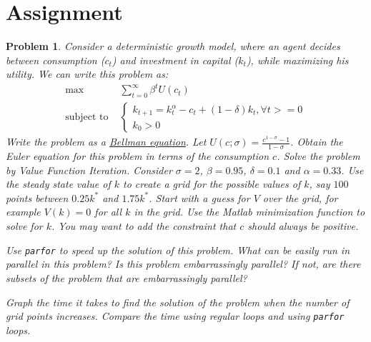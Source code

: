 \documentclass[12pt, a4paper]{article}
\newtheorem{problem}{Problem}
\begin{document}
\section{Assignment}
\label{sec:org52739c4}
\begin{problem}
Consider a deterministic growth model, where an agent decides between consumption (\(c_t\)) and investment in capital (\(k_t\)), while maximizing his utility.
We can write this problem as:
\begin{align*}
  \max&\sum_{t=0}^{\infty}\beta^tU(c_t)\\
  \text{subject to }&
                      \begin{cases}
                        k_{t+1} = k_t^{\alpha} - c_t + (1-\delta)k_t, \forall t >= 0\\
                        k_0 > 0
                      \end{cases}
\end{align*}
Write the problem as a \href{https://en.wikipedia.org/wiki/Bellman\_equation}{Bellman equation}.
Let \(U(c; \sigma)=\frac{c^{1-\sigma}-1}{1-\sigma}\).
Obtain the Euler equation for this problem in terms of the consumption \(c\).
Solve the problem by Value Function Iteration.
Consider \(\sigma=2\), \(\beta=0.95\), \(\delta=0.1\) and \(\alpha=0.33\).
Use the steady state value of \(k\) to create a grid for the possible values of \(k\), say \(100\) points between \(0.25 k^*\) and \(1.75 k^*\).
Start with a guess for \(V\) over the grid, for example \(V(k)=0\) for all \(k\) in the grid.
Use the Matlab minimization function to solve for \(k\).
You may want to add the constraint that \(c\) should always be positive.

Use \texttt{parfor} to speed up the solution of this problem.
What can be easily run in parallel in this problem?
Is this problem embarrassingly parallel? If not, are there subsets of the problem that are embarrassingly parallel?

Graph the time it takes to find the solution of the problem when the number of grid points increases.
Compare the time using regular loops and using \texttt{parfor} loops.
\end{problem}
\newpage
\printbibliography
\newpage
\end{document}
